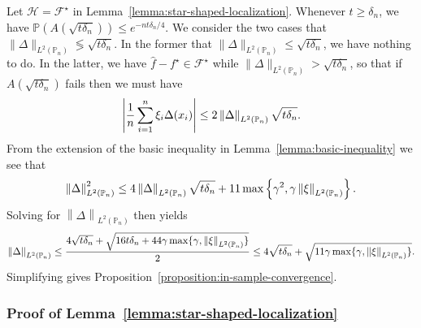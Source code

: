 \documentclass[11pt]{article}
\newcommand{\Prb}{\mathbb{P}}
\renewcommand{\P}{\mathbb{P}}
\newcommand{\mc}[1]{\mathcal{#1}}
\newcommand{\norm}[1]{\left\|{#1}\right\|} %
\newcommand{\what}[1]{\widehat{#1}}
\newcommand{\norms}[1]{\|{#1}\|} %
\newcommand{\<}{\langle} %
\renewcommand{\>}{\rangle}
\newcommand{\LtwoPn}[1]{\norm{#1}_{L^2(\Prb_n)}}
\newcommand{\LtwoPns}[1]{\norms{#1}_{L^2(\Prb_n)}}
\newcommand{\opt}{^\star}
\begin{document}
Let $\mc{H} = \mc{F}\opt$ in Lemma~\ref{lemma:star-shaped-localization}.
Whenever $t \ge \delta_n$, we have
$\P(A(\sqrt{t \delta_n})) \le e^{-nt \delta_n / 4}$. We consider the two
cases that $\LtwoPns{\Delta} \lessgtr \sqrt{t \delta_n}$. In the
former that $\LtwoPns{\Delta} \le \sqrt{t \delta_n}$, we have
nothing to do. In the latter, we have $\what{f} - f\opt \in \mc{F}\opt$
while $\LtwoPns{\Delta} > \sqrt{t \delta_n}$, so that if
$A(\sqrt{t \delta_n})$ fails then we must have
\begin{equation*}
  \left|\frac{1}{n} \sum_{i = 1}^n \noise_i \Delta(x_i)\right|
  \le 2 \LtwoPn{\Delta} \sqrt{t \delta_n}.
\end{equation*}
From the extension of the basic inequality in
Lemma~\ref{lemma:basic-inequality} we see that
\begin{equation*}
  \LtwoPn{\Delta}^2 \le 
  4 \LtwoPn{\Delta} \sqrt{t \delta_n} +
  11 \max\left\{\gamma^2, \gamma \LtwoPn{\noise}\right\}.
\end{equation*}
Solving for $\LtwoPn{\Delta}$ then yields
\begin{equation*}
  \LtwoPn{\Delta}
  \le \frac{4 \sqrt{t \delta_n} + \sqrt{16 t \delta_n
      + 44 \gamma \max\{\gamma, \LtwoPn{\noise}\}}}{2}
  \le 4 \sqrt{t \delta_n} +
  \sqrt{11 \gamma \max\{\gamma, \LtwoPn{\noise}\}}.
\end{equation*}
Simplifying gives Proposition~\ref{proposition:in-sample-convergence}.

\subsubsection{Proof of Lemma~\ref{lemma:star-shaped-localization}}
\label{sec:proof-star-shaped-localization}
\end{document}
